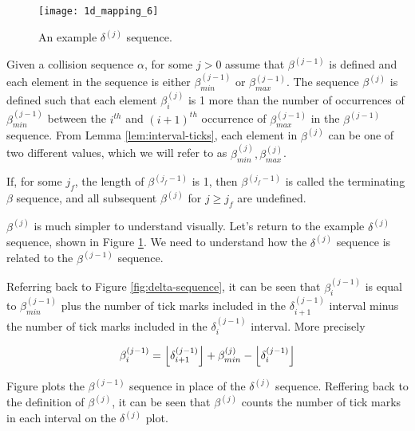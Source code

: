 \begin{figure}[H]
  \begin{center}
    \texttt{[image: 1d\_mapping\_6]}
  \end{center}
  \vspace{-.2in} %
  \caption{\label{fig:delta-sequence-2} An example $\delta^{(j)}$ sequence.}
\end{figure}

\begin{definition}
  \label{def:beta-definition}
  Given a collision sequence $\alpha$, for some $j > 0$ assume that $\beta^{(j-1)}$ is defined and each element in the sequence is either $\beta^{(j-1)}_{min}$ or $\beta^{(j-1)}_{max}$. The sequence $\beta^{(j)}$ is defined such that each element $\beta^{(j)}_i$ is 1 more than the number of occurrences of $\beta^{(j-1)}_{min}$ between the $i^{th}$ and $(i+1)^{th}$ occurrence of $\beta^{(j-1)}_{max}$ in the $\beta^{(j-1)}$ sequence. From Lemma \ref{lem:interval-ticks}, each element in $\beta^{(j)}$ can be one of two different values, which we will refer to as $\beta^{(j)}_{min}, \beta^{(j)}_{max}$.

  If, for some $j_f$, the length of $\beta^{(j_f-1)}$ is 1, then $\beta^{(j_f-1)}$ is called the terminating $\beta$ sequence, and all subsequent $\beta^{(j)}$ for $j \ge j_f$ are undefined.
\end{definition}

$\beta^{(j)}$ is much simpler to understand visually. Let's return to the example $\delta^{(j)}$ sequence, shown in Figure \ref{fig:delta-sequence-2}. We need to understand how the $\delta^{(j)}$ sequence is related to the $\beta^{(j-1)}$ sequence. 

Referring back to Figure \ref{fig:delta-sequence}, it can be seen that $\beta^{(j-1)}_i$ is equal to $\beta^{(j-1)}_{min}$ plus the number of tick marks included in the $\delta^{(j-1)}_{i+1}$ interval minus the number of tick marks included in the $\delta^{(j-1)}_i$ interval. More precisely

\begin{align}\label{eq:beta_i}
  \beta^{(j-1)}_i = \floor{\delta^{(j-1)}_{i+1}} + \beta^{(j)}_{min} - \floor{\delta^{(j-1)}_i} 
\end{align}

Figure plots the $\beta^{(j-1)}$ sequence in place of the $\delta^{(j)}$ sequence. Reffering back to the definition of $\beta^{(j)}$, it can be seen that $\beta^{(j)}$ counts the number of tick marks in each interval on the $\delta^{(j)}$ plot.

